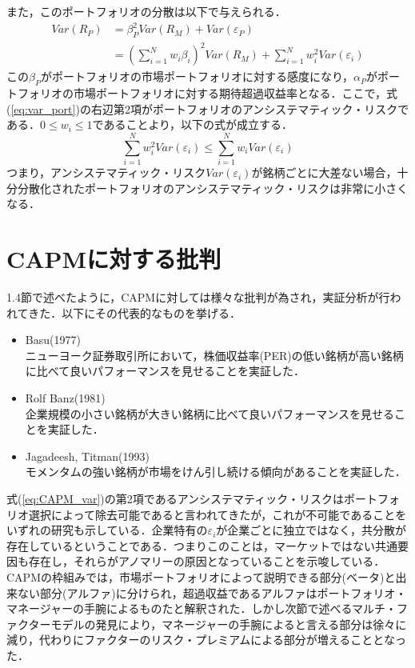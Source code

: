 \documentclass[11pt]{jreport}
\begin{document}
また，このポートフォリオの分散は以下で与えられる．
\begin{equation}
\begin{split}
Var(R_P) &= \beta_P^2 Var(R_M) + Var(\varepsilon_P)\\
& = \left(\sum_{i=1}^N w_i\beta_i\right)^2Var(R_M) + \sum_{i=1}^N w_i^2 Var(\varepsilon_i)
\label{eq:var_port}
\end{split}
\end{equation}
この$\beta_P$がポートフォリオの市場ポートフォリオに対する感度になり，$\alpha_P$がポートフォリオの市場ポートフォリオに対する期待超過収益率となる．ここで，式(\ref{eq:var_port})の右辺第2項がポートフォリオのアンシステマティック・リスクである．$0\leq w_i \leq 1$であることより，以下の式が成立する．
\begin{equation}
\sum_{i=1}^N w_i^2Var(\varepsilon_i) \leq \sum_{i=1}^N w_iVar(\varepsilon_i)
\end{equation}
つまり，アンシステマティック・リスク$Var(\varepsilon_i)$が銘柄ごとに大差ない場合，十分分散化されたポートフォリオのアンシステマティック・リスクは非常に小さくなる．



\section{CAPMに対する批判}
1.4節で述べたように，CAPMに対しては様々な批判が為され，実証分析が行われてきた．以下にその代表的なものを挙げる．
\begin{itemize}
\item Basu(1977)\cite{Basu}\\
ニューヨーク証券取引所において，株価収益率(PER)の低い銘柄が高い銘柄に比べて良いパフォーマンスを見せることを実証した．
\item Rolf Banz(1981)\cite{Banz}\\
企業規模の小さい銘柄が大きい銘柄に比べて良いパフォーマンスを見せることを実証した．
\item Jagadeesh, Titman(1993)\cite{Jagadeesh}\\
モメンタムの強い銘柄が市場をけん引し続ける傾向があることを実証した．
\end{itemize}

式(\ref{eq:CAPM_var})の第2項であるアンシステマティック・リスクはポートフォリオ選択によって除去可能であると言われてきたが，これが不可能であることをいずれの研究も示している．企業特有の$\varepsilon_i$が企業ごとに独立ではなく，共分散が存在しているということである．つまりこのことは，マーケットではない共通要因も存在し，それらがアノマリーの原因となっていることを示唆している．CAPMの枠組みでは，市場ポートフォリオによって説明できる部分(ベータ)と出来ない部分(アルファ)に分けられ，超過収益であるアルファはポートフォリオ・マネージャーの手腕によるものたと解釈された．しかし次節で述べるマルチ・ファクターモデルの発見により，マネージャーの手腕によると言える部分は徐々に減り，代わりにファクターのリスク・プレミアムによる部分が増えることとなった．
\end{document}
